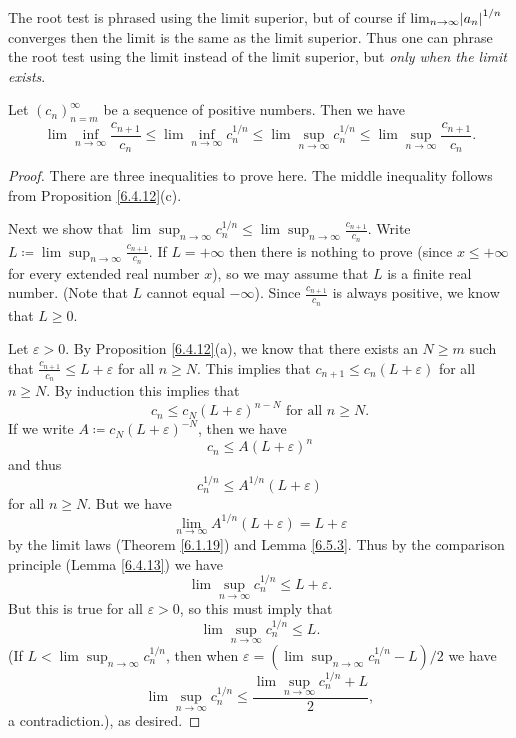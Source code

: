 \begin{note}
The root test is phrased using the limit superior, but of course if \(\lim_{n \to \infty} \abs*{a_n}^{1 / n}\) converges then the limit is the same as the limit superior.
Thus one can phrase the root test using the limit instead of the limit superior, but \emph{only when the limit exists}.
\end{note}

\begin{lemma}\label{7.5.2}
Let \((c_n)_{n = m}^\infty\) be a sequence of positive numbers.
Then we have
\[
    \lim\inf_{n \to \infty} \frac{c_{n + 1}}{c_n} \leq \lim\inf_{n \to \infty} c_n^{1 / n} \leq \lim\sup_{n \to \infty} c_n^{1 / n} \leq \lim\sup_{n \to \infty} \frac{c_{n + 1}}{c_n}.
\]
\end{lemma}

\begin{proof}
There are three inequalities to prove here.
The middle inequality follows from Proposition \ref{6.4.12}(c).

Next we show that \(\lim\sup_{n \to \infty} c_n^{1 / n} \leq \lim\sup_{n \to \infty} \frac{c_{n + 1}}{c_n}\).
Write \(L \coloneqq \lim\sup_{n \to \infty} \frac{c_{n + 1}}{c_n}\).
If \(L = +\infty\) then there is nothing to prove (since \(x \leq +\infty\) for every extended real number \(x\)), so we may assume that \(L\) is a finite real number.
(Note that \(L\) cannot equal \(-\infty\)).
Since \(\frac{c_{n + 1}}{c_n}\) is always positive, we know that \(L \geq 0\).

Let \(\varepsilon > 0\).
By Proposition \ref{6.4.12}(a), we know that there exists an \(N \geq m\) such that \(\frac{c_{n + 1}}{c_n} \leq L + \varepsilon\) for all \(n \geq N\).
This implies that \(c_{n + 1} \leq c_n (L + \varepsilon)\) for all \(n \geq N\).
By induction this implies that
\[
    c_n \leq c_N (L + \varepsilon)^{n - N} \text{ for all } n \geq N.
\]
If we write \(A \coloneqq c_N (L + \varepsilon)^{-N}\), then we have
\[
    c_n \leq A(L + \varepsilon)^n
\]
and thus
\[
    c_n^{1 / n} \leq A^{1 / n} (L + \varepsilon)
\]
for all \(n \geq N\).
But we have
\[
    \lim_{n \to \infty} A^{1 / n} (L + \varepsilon) = L + \varepsilon
\]
by the limit laws (Theorem \ref{6.1.19}) and Lemma \ref{6.5.3}.
Thus by the comparison principle (Lemma \ref{6.4.13}) we have
\[
    \lim\sup_{n \to \infty} c_n^{1 / n} \leq L + \varepsilon.
\]
But this is true for all \(\varepsilon > 0\), so this must imply that
\[
    \lim\sup_{n \to \infty} c_n^{1 / n} \leq L.
\]
(If \(L < \lim\sup_{n \to \infty} c_n^{1 / n}\), then when \(\varepsilon = (\lim\sup_{n \to \infty} c_n^{1 / n} - L) / 2\) we have
\[
    \lim\sup_{n \to \infty} c_n^{1 / n} \leq \frac{\lim\sup_{n \to \infty} c_n^{1 / n} + L}{2},
\]
a contradiction.), as desired.


\end{proof}
